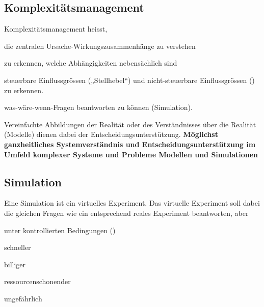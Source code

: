 \subsection{Komplexitätsmanagement}
Komplexitätsmanagement heisst,
\begin{compactitem}
	\item die zentralen Ursache-Wirkungszusammenhänge zu verstehen
	\item zu erkennen, welche Abhängigkeiten nebensächlich sind
	\item steuerbare Einflussgrössen („Stellhebel“) und nicht-steuerbare Einflussgrössen () zu erkennen.
	\item was-wäre-wenn-Fragen beantworten zu können (Simulation).
\end{compactitem}
Vereinfachte Abbildungen der Realität oder des Verständnisses über die Realität (Modelle) dienen dabei der Entscheidungsunterstützung.
\textbf{Möglichst ganzheitliches Systemverständnis und Entscheidungsunterstützung im Umfeld komplexer Systeme und Probleme Modellen und Simulationen}

\subsection{Simulation}
Eine Simulation ist ein virtuelles Experiment. Das virtuelle Experiment soll dabei die gleichen Fragen wie
ein entsprechend reales Experiment beantworten, aber
\begin{multicols}{3}
	\begin{compactitem}
		\item unter kontrollierten Bedingungen ()
		\item schneller
		\item billiger
		\item ressourcenschonender
		\item ungefährlich
	\end{compactitem}
\end{multicols}